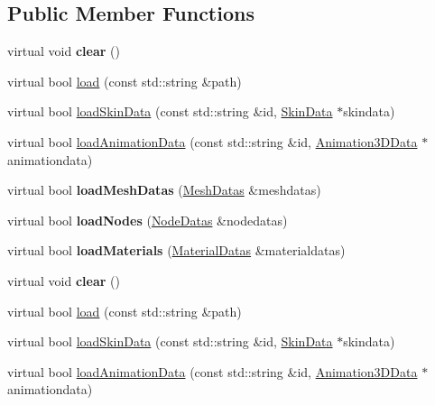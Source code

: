 \subsection*{Public Member Functions}
\begin{DoxyCompactItemize}
\item 
\mbox{\label{classBundle3D_aff84cf9426b151c05964590a84732da6}} 
virtual void {\bfseries clear} ()
\item 
virtual bool \hyperlink{classBundle3D_af3cfd71d2814f21b64e8343d447528a1}{load} (const std\+::string \&path)
\item 
virtual bool \hyperlink{classBundle3D_ae05b0ca31ac57e8184c06d64a8190995}{load\+Skin\+Data} (const std\+::string \&id, \hyperlink{structSkinData}{Skin\+Data} $\ast$skindata)
\item 
virtual bool \hyperlink{classBundle3D_a872eabde22d91ec0d412f4286e690d56}{load\+Animation\+Data} (const std\+::string \&id, \hyperlink{structAnimation3DData}{Animation3\+D\+Data} $\ast$animationdata)
\item 
\mbox{\label{classBundle3D_ab6880713515ad5a666b55c3ad53674b1}} 
virtual bool {\bfseries load\+Mesh\+Datas} (\hyperlink{structMeshDatas}{Mesh\+Datas} \&meshdatas)
\item 
\mbox{\label{classBundle3D_a700ef2c52258837a6e4dd53d03b122ff}} 
virtual bool {\bfseries load\+Nodes} (\hyperlink{structNodeDatas}{Node\+Datas} \&nodedatas)
\item 
\mbox{\label{classBundle3D_a63f9f94a37deb0f7d9c0be3a2de8a884}} 
virtual bool {\bfseries load\+Materials} (\hyperlink{structMaterialDatas}{Material\+Datas} \&materialdatas)
\item 
\mbox{\label{classBundle3D_a2fe09696c8ad71118973aebb5f5f72c5}} 
virtual void {\bfseries clear} ()
\item 
virtual bool \hyperlink{classBundle3D_a3a86dcfb37941ff198572dffe0f60b74}{load} (const std\+::string \&path)
\item 
virtual bool \hyperlink{classBundle3D_ac7d550f1334d0cb561c098f93fd1caf1}{load\+Skin\+Data} (const std\+::string \&id, \hyperlink{structSkinData}{Skin\+Data} $\ast$skindata)
\item 
virtual bool \hyperlink{classBundle3D_a7b652fc7f56623ad51a4c84a6c68d8c9}{load\+Animation\+Data} (const std\+::string \&id, \hyperlink{structAnimation3DData}{Animation3\+D\+Data} $\ast$animationdata)

\end{DoxyCompactItemize}
